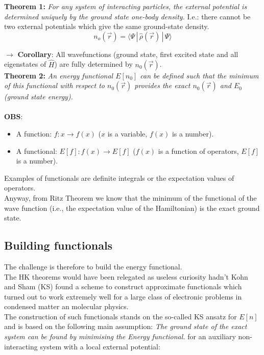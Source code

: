 \textbf{Theorem 1:} \textit{For any system of interacting particles, the external potential is determined uniquely by the ground state one-body density.} I.e.: there cannot be two  external potentials which give the same ground-state density.
\[n_o(\vec{r})=\langle \Psi\,|\,\hat{\rho}(\vec{r})\,|\,\Psi \rangle\]

$\rightarrow\,\,$\textbf{Corollary}: All wavefunctions (ground state, first excited state and all eigenstates of $\hat{H}$) are fully determined by $n_0(\vec{r})$.\\

\textbf{Theorem 2:} \textit{An energy functional $E[n_0]$ can be defined such that the minimum of this functional with respect to $n_0(\vec{r})$ provides the exact $n_0(\vec{r})$ and $E_0$ (ground state energy).}\\
\\

\textbf{OBS}: 
\begin{itemize}
\item A function: $f: x \rightarrow f(x)$ ($x$ is a variable, $f(x)$ is a number).
\item A functional: $E[f]: f(x) \rightarrow E[f]$ ($f(x)$ is a function of operators, $E[f]$ is a number).
\end{itemize} 
 
Examples of functionals are definite integrals or the expectation values of operators.\\
Anyway, from Ritz Theorem we know that the minimum of the functional of the wave function (i.e., the expectation value of the Hamiltonian) is the exact ground state.\\
\subsection{Building functionals}
The challenge is therefore to build the energy functional.\\
The HK theorems would have been relegated as useless curiosity hadn’t Kohn and Sham
(KS) found a scheme to construct approximate functionals which turned out to
work extremely well for a large class of electronic problems in condensed matter an
molecular physics. \\
The construction of such functionals stands on the so-called KS ansatz for $E[n]$
and is based on the following main assumption: \textit{The ground state of the exact system can be found by minimising the Energy functional.}
for an auxiliary non-interacting system with a local external potential: 

